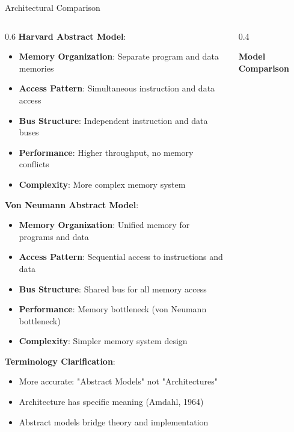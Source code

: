 \documentclass[aspectratio=169]{beamer}
\newcommand{\concept}[1]{\textbf{\color{darkblue}#1}}
\begin{document}
\begin{frame}{Architectural Comparison}
\begin{columns}
\begin{column}{0.6\textwidth}
\concept{Harvard Abstract Model}:
\begin{itemize}
\item \textbf{Memory Organization}: Separate program and data memories
\item \textbf{Access Pattern}: Simultaneous instruction and data access
\item \textbf{Bus Structure}: Independent instruction and data buses
\item \textbf{Performance}: Higher throughput, no memory conflicts
\item \textbf{Complexity}: More complex memory system
\end{itemize}

\vspace{0.3cm}
\concept{Von Neumann Abstract Model}:
\begin{itemize}
\item \textbf{Memory Organization}: Unified memory for programs and data
\item \textbf{Access Pattern}: Sequential access to instructions and data
\item \textbf{Bus Structure}: Shared bus for all memory access
\item \textbf{Performance}: Memory bottleneck (von Neumann bottleneck)
\item \textbf{Complexity}: Simpler memory system design
\end{itemize}

\vspace{0.3cm}
\concept{Terminology Clarification}:
\begin{itemize}
\item More accurate: "Abstract Models" not "Architectures"
\item Architecture has specific meaning (Amdahl, 1964)
\item Abstract models bridge theory and implementation
\end{itemize}
\end{column}
\begin{column}{0.4\textwidth}
\begin{center}
\textbf{Model Comparison}
\vspace{0.3cm}

\end{center}
\end{column}
\end{columns}
\end{frame}
\end{document}
